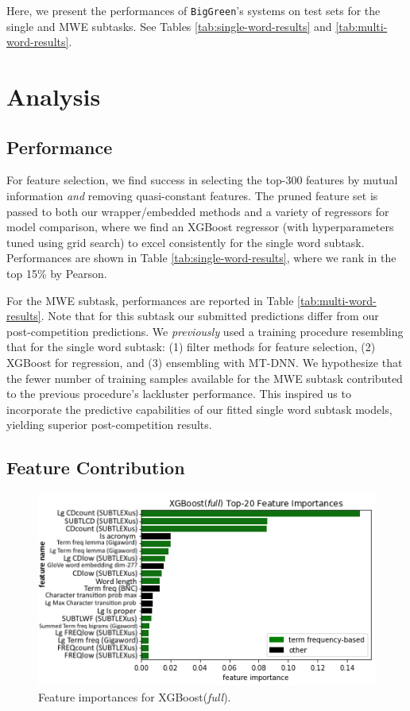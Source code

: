 \documentclass[11pt,a4paper]{article}
\begin{document}
Here, we present the performances of \texttt{BigGreen}'s systems on test sets for the single and MWE subtasks. See Tables \ref{tab:single-word-results} and \ref{tab:multi-word-results}.

\section{Analysis}

\subsection{Performance}

For feature selection, we find success in selecting the top-300 features by mutual information \textit{and} removing quasi-constant features. The pruned feature set is passed to both our wrapper/embedded methods and a variety of regressors for model comparison, where we find an XGBoost regressor \citep{DBLP:journals/corr/ChenG16} (with hyperparameters tuned using grid search) to excel consistently for the single word subtask. Performances are shown in Table \ref{tab:single-word-results}, where we rank in the top 15\% by Pearson. 

For the MWE subtask, performances are reported in Table \ref{tab:multi-word-results}. Note that for this subtask our submitted predictions differ from our post-competition predictions. We \textit{previously} used a training procedure resembling that for the single word subtask: (1) filter methods for feature selection, (2) XGBoost for regression, and (3) ensembling with MT-DNN. We hypothesize that the fewer number of training samples available for the MWE subtask contributed to the previous procedure's lackluster performance. This inspired us to incorporate the predictive capabilities of our fitted single word subtask models, yielding superior post-competition results.

\subsection{Feature Contribution}

\begin{figure}
  \centering
  \includegraphics[scale=0.45]{xgboost_feature_importances.png}
  \captionsetup{justification=centering}
  \caption{\label{fig:xgboost_feature_importance} Feature importances for XGBoost(\textit{full}).}
\end{figure}
\end{document}
